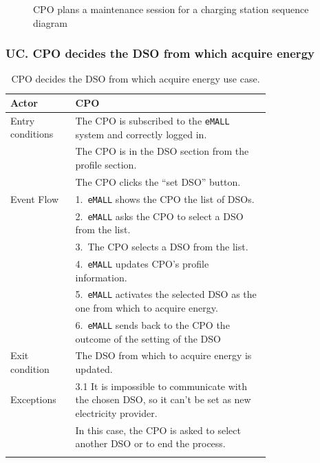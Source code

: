 \begin{center}
\begin{figure} [H]
\begin{center}
            \caption{CPO plans a maintenance session for a charging station sequence diagram}
            \label{fig: cpo_plans_maintenance_seq_diag}
        \end{center}
    \end{figure}
\end{center}

\subsubsection*{UC\cuc . CPO decides the DSO from which acquire energy}
\begin{center}
    \begin{longtable}{lp{0.75\linewidth}}
        \hline
        Actor            & CPO                                                                                  \\
        \hline
        Entry conditions & The CPO is subscribed to the \verb|eMALL| system and correctly logged in.            \\
        & The CPO is in the DSO section from the profile section.                              \\
        & The CPO clicks the “set DSO” button.                                                 \\
        \hline
        Event Flow       & 1.\ \verb|eMALL| shows the CPO the list of DSOs.                                     \\
        & 2.\ \verb|eMALL| asks the CPO to select a DSO from the list.                         \\
        & 3.\ The CPO selects a DSO from the list.                                             \\
        & 4.\ \verb|eMALL| updates CPO’s profile information.                                  \\
        & 5.\ \verb|eMALL| activates the selected DSO as the one from which to acquire energy. \\
        & 6.\ \verb|eMALL| sends back to the CPO the outcome of the setting of the DSO         \\
        \hline
        Exit condition   & The DSO from which to acquire energy is updated.                                     \\
        \hline
        Exceptions       & 3.1 It is impossible to communicate with the chosen DSO, so it can't be set as new electricity provider. \\
        & In this case, the CPO is asked to select another DSO or to end the process.                              \\
        \hline
        \caption{CPO decides the DSO from which acquire energy use case.}
        \label{tab: CPO_decides_DSO_use_case}
    \end{longtable}


\end{center}
